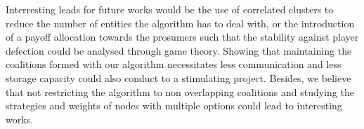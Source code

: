 \documentclass[conference]{IEEEtran}
\begin{document}

Interresting leads for future works would be the use of correlated clusters to reduce the number of entities the algorithm has to deal with, or the introduction of a payoff allocation towards the prosumers such that the stability against player defection could be analysed through game theory. Showing that maintaining the coalitions formed with our algorithm necessitates less communication and less storage capacity could also conduct to a stimulating project. Besides, we believe that not restricting the algorithm to non overlapping coalitions and studying the strategies and weights of nodes with multiple options could lead to interesting works.








%
%
%


 
  






\end{document}
